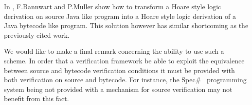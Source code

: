 

 In \cite{FB04LBT}, F.Bannwart and P.Muller show how to transform a Hoare style logic derivation on source Java like
 program into a Hoare style logic derivation of a Java bytecode like program. This solution however has similar  shortcoming
as the previously cited work.

We would like to make a final remark concerning the ability to use such a scheme.
In order that a verification framework be able to exploit the equivalence between source
 and bytecode verification conditions it must be provided with both verification on source and bytecode. 
For instance, the Spec\#~\cite{BLS04sp} programming system being not provided with a mechanism for source verification may not benefit from this fact.
  


